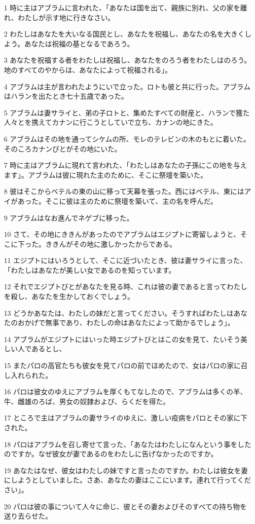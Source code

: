 \par 1 時に主はアブラムに言われた、「あなたは国を出て、親族に別れ、父の家を離れ、わたしが示す地に行きなさい。
\par 2 わたしはあなたを大いなる国民とし、あなたを祝福し、あなたの名を大きくしよう。あなたは祝福の基となるであろう。
\par 3 あなたを祝福する者をわたしは祝福し、あなたをのろう者をわたしはのろう。地のすべてのやからは、あなたによって祝福される」。
\par 4 アブラムは主が言われたようにいで立った。ロトも彼と共に行った。アブラムはハランを出たとき七十五歳であった。
\par 5 アブラムは妻サライと、弟の子ロトと、集めたすべての財産と、ハランで獲た人々とを携えてカナンに行こうとしていで立ち、カナンの地にきた。
\par 6 アブラムはその地を通ってシケムの所、モレのテレビンの木のもとに着いた。そのころカナンびとがその地にいた。
\par 7 時に主はアブラムに現れて言われた、「わたしはあなたの子孫にこの地を与えます」。アブラムは彼に現れた主のために、そこに祭壇を築いた。
\par 8 彼はそこからベテルの東の山に移って天幕を張った。西にはベテル、東にはアイがあった。そこに彼は主のために祭壇を築いて、主の名を呼んだ。
\par 9 アブラムはなお進んでネゲブに移った。
\par 10 さて、その地にききんがあったのでアブラムはエジプトに寄留しようと、そこに下った。ききんがその地に激しかったからである。
\par 11 エジプトにはいろうとして、そこに近づいたとき、彼は妻サライに言った、「わたしはあなたが美しい女であるのを知っています。
\par 12 それでエジプトびとがあなたを見る時、これは彼の妻であると言ってわたしを殺し、あなたを生かしておくでしょう。
\par 13 どうかあなたは、わたしの妹だと言ってください。そうすればわたしはあなたのおかげで無事であり、わたしの命はあなたによって助かるでしょう」。
\par 14 アブラムがエジプトにはいった時エジプトびとはこの女を見て、たいそう美しい人であるとし、
\par 15 またパロの高官たちも彼女を見てパロの前でほめたので、女はパロの家に召し入れられた。
\par 16 パロは彼女のゆえにアブラムを厚くもてなしたので、アブラムは多くの羊、牛、雌雄のろば、男女の奴隷および、らくだを得た。
\par 17 ところで主はアブラムの妻サライのゆえに、激しい疫病をパロとその家に下された。
\par 18 パロはアブラムを召し寄せて言った、「あなたはわたしになんという事をしたのですか。なぜ彼女が妻であるのをわたしに告げなかったのですか。
\par 19 あなたはなぜ、彼女はわたしの妹ですと言ったのですか。わたしは彼女を妻にしようとしていました。さあ、あなたの妻はここにいます。連れて行ってください」。
\par 20 パロは彼の事について人々に命じ、彼とその妻およびそのすべての持ち物を送り去らせた。

